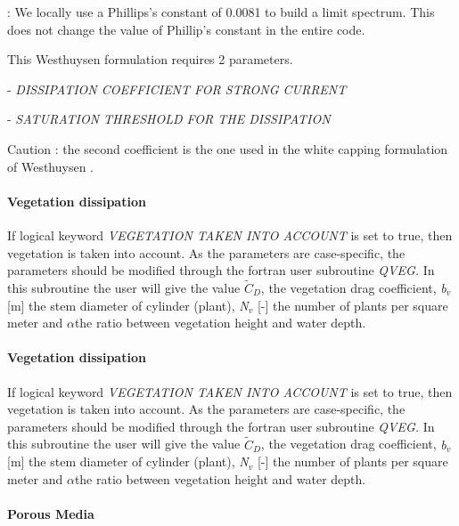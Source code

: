 \textbf{} : We locally use a Phillips's constant of 0.0081 to build a limit spectrum. This does not change the value of Phillip's constant in the entire code.  

 \textbf{}

 This Westhuysen formulation requires 2 parameters.

 - \textit{DISSIPATION COEFFICIENT FOR STRONG CURRENT}

 - \textit{SATURATION THRESHOLD FOR THE DISSIPATION}

 Caution : the second coefficient is the one used in the white capping formulation of Westhuysen \cite{Westhuys2008}.


\paragraph{ Vegetation dissipation}

 If logical keyword \textit{VEGETATION TAKEN INTO ACCOUNT} is set to true, then vegetation is taken into account. As the parameters are case-specific, the parameters should be modified through the fortran user subroutine \textit{QVEG. }In this subroutine the user will give the value $\tilde{C}_{D} $, the vegetation drag coefficient, \textit{b${}_{v}$} [m] the stem diameter of cylinder (plant), \textit{N${}_{v}$} [-] the number of plants per square meter and $\alpha $the ratio between vegetation height and water depth.

\paragraph{ Vegetation dissipation}

 If logical keyword \textit{VEGETATION TAKEN INTO ACCOUNT} is set to true, then vegetation is taken into account. As the parameters are case-specific, the parameters should be modified through the fortran user subroutine \textit{QVEG. }In this subroutine the user will give the value $\tilde{C}_{D} $, the vegetation drag coefficient, \textit{b${}_{v}$} [m] the stem diameter of cylinder (plant), \textit{N${}_{v}$} [-] the number of plants per square meter and $\alpha $the ratio between vegetation height and water depth.

\paragraph{Porous Media}

